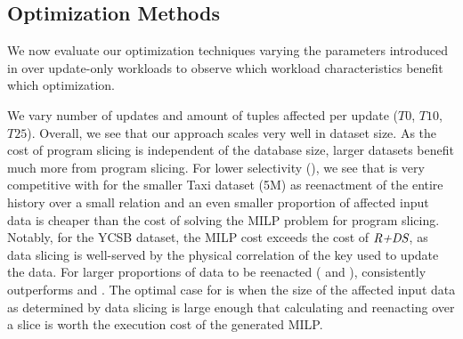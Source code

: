 

\subsection{Optimization Methods}
We now evaluate our optimization techniques varying the parameters introduced in  over update-only workloads to observe which workload characteristics benefit which optimization.



We vary number of updates and amount of tuples affected per update ($T0$, $T10$, $T25$). Overall, we see that our approach scales very well in dataset size. As the cost of program slicing is independent of the database size, larger datasets benefit much more from program slicing. %
For lower selectivity (), we see that \mrd is very competitive with \mrdp for the smaller Taxi dataset (5M) as reenactment of the entire history over a small relation and an even smaller proportion of affected input data is cheaper than the cost of solving the MILP problem for program slicing. Notably, for the YCSB dataset, the MILP cost exceeds the cost of $\textit{R+DS}$, as data slicing is well-served by the physical correlation of the key used to update the data. For larger proportions of data to be reenacted ( and ),  \mrdp  consistently outperforms \mrp and \mrd. The optimal case for \mrdp is when the size of the  affected input data as determined by data slicing is large enough that calculating and reenacting over a slice is worth the execution cost of the generated MILP.

